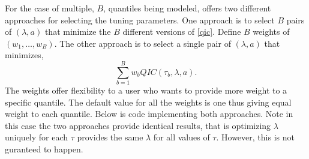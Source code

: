 \documentclass[article]{rqPenVignette}%
\begin{document}
For the case of multiple, $B$, quantiles being modeled,  offers two different approaches for selecting the tuning parameters. One approach is to select $B$ pairs of $(\lambda,a)$ that minimize the $B$ different versions of \eqref{qic}. Define $B$ weights of $(w_1,\ldots,w_B)$. The other approach is to select a single pair of $(\lambda,a)$ that minimizes,
\begin{equation}
\sum_{b=1}^B w_b QIC(\tau_b,\lambda,a).
\end{equation}
The weights offer flexibility to a user who wants to provide more weight to a specific quantile. The default value for all the weights is one thus giving equal weight to each quantile. Below is code implementing both approaches. Note in this case the two approaches provide identical results, that is optimizing $\lambda$ uniquely for each $\tau$ provides the same $\lambda$ for all values of $\tau$. However, this is not guranteed to happen. 
\end{document}
